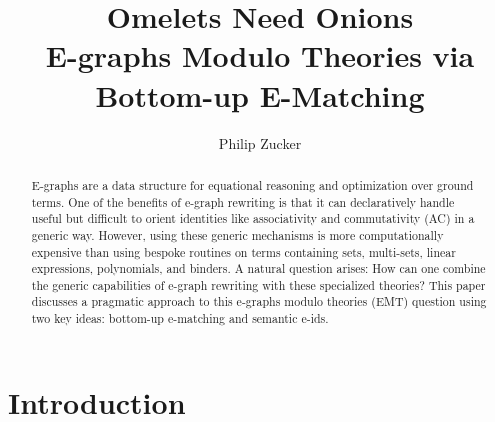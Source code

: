 \documentclass[sigconf]{acmart}
\begin{document}
\title{Omelets Need Onions \\ \large E-graphs Modulo Theories via Bottom-up E-Matching}


\author{Philip Zucker}


\begin{abstract}
    E-graphs\cite{eggpaper} are a data structure for equational reasoning and optimization over ground terms. One of
     the benefits of e-graph rewriting is that it can declaratively handle useful but difficult to orient identities like 
     associativity and commutativity (AC) in a generic way. However, using these generic mechanisms
      is more computationally expensive than using bespoke routines on terms containing sets, multi-sets, linear expressions, polynomials, and binders.
        A natural question arises: How can one combine the generic capabilities of e-graph rewriting with these specialized theories?
        This paper discusses a pragmatic approach to this e-graphs modulo theories (EMT) question using two key ideas: bottom-up e-matching and semantic e-ids.


\end{abstract}




\maketitle

\section{Introduction}

\end{document}

